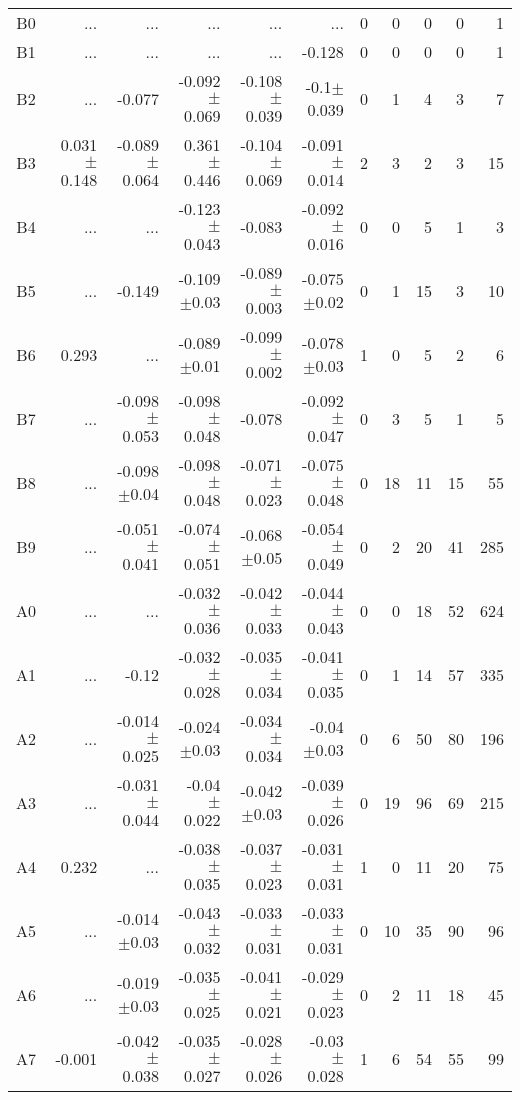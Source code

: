 \begin{table}[t]
\begin{table}[t]
\begin{center}
\begin{tabular}{c|rrrrr|rrrrr}
    B0	&	 ...	&	 ...	&	 ...	&	 ...	&	 ...	&	0	&	0	&	0	&	0	&	1	\\
    B1	&	 ...	&	 ...	&	 ...	&	 ...	&	-0.128	&	0	&	0	&	0	&	0	&	1	\\
    B2	&	 ...	&	-0.077	&	-0.092$\pm$0.069	&	-0.108$\pm$0.039	&	-0.1$\pm$0.039	&	0	&	1	&	4	&	3	&	7	\\
    B3	&	0.031$\pm$0.148	&	-0.089$\pm$0.064	&	0.361$\pm$0.446	&	-0.104$\pm$0.069	&	-0.091$\pm$0.014	&	2	&	3	&	2	&	3	&	15	\\
    B4	&	 ...	&	 ...	&	-0.123$\pm$0.043	&	-0.083	&	-0.092$\pm$0.016	&	0	&	0	&	5	&	1	&	3	\\
    B5	&	 ...	&	-0.149	&	-0.109$\pm$0.03	&	-0.089$\pm$0.003	&	-0.075$\pm$0.02	&	0	&	1	&	15	&	3	&	10	\\
    B6	&	0.293	&	 ...	&	-0.089$\pm$0.01	&	-0.099$\pm$0.002	&	-0.078$\pm$0.03	&	1	&	0	&	5	&	2	&	6	\\
    B7	&	 ...	&	-0.098$\pm$0.053	&	-0.098$\pm$0.048	&	-0.078	&	-0.092$\pm$0.047	&	0	&	3	&	5	&	1	&	5	\\
    B8	&	 ...	&	-0.098$\pm$0.04	&	-0.098$\pm$0.048	&	-0.071$\pm$0.023	&	-0.075$\pm$0.048	&	0	&	18	&	11	&	15	&	55	\\
    B9	&	 ...	&	-0.051$\pm$0.041	&	-0.074$\pm$0.051	&	-0.068$\pm$0.05	&	-0.054$\pm$0.049	&	0	&	2	&	20	&	41	&	285	\\
    A0	&	 ...	&	 ...	&	-0.032$\pm$0.036	&	-0.042$\pm$0.033	&	-0.044$\pm$0.043	&	0	&	0	&	18	&	52	&	624	\\
    A1	&	 ...	&	-0.12	&	-0.032$\pm$0.028	&	-0.035$\pm$0.034	&	-0.041$\pm$0.035	&	0	&	1	&	14	&	57	&	335	\\
    A2	&	 ...	&	-0.014$\pm$0.025	&	-0.024$\pm$0.03	&	-0.034$\pm$0.034	&	-0.04$\pm$0.03	&	0	&	6	&	50	&	80	&	196	\\
    A3	&	 ...	&	-0.031$\pm$0.044	&	-0.04$\pm$0.022	&	-0.042$\pm$0.03	&	-0.039$\pm$0.026	&	0	&	19	&	96	&	69	&	215	\\
    A4	&	0.232	&	 ...	&	-0.038$\pm$0.035	&	-0.037$\pm$0.023	&	-0.031$\pm$0.031	&	1	&	0	&	11	&	20	&	75	\\
    A5	&	 ...	&	-0.014$\pm$0.03	&	-0.043$\pm$0.032	&	-0.033$\pm$0.031	&	-0.033$\pm$0.031	&	0	&	10	&	35	&	90	&	96	\\
    A6	&	 ...	&	-0.019$\pm$0.03	&	-0.035$\pm$0.025	&	-0.041$\pm$0.021	&	-0.029$\pm$0.023	&	0	&	2	&	11	&	18	&	45	\\
    A7	&	-0.001	&	-0.042$\pm$0.038	&	-0.035$\pm$0.027	&	-0.028$\pm$0.026	&	-0.03$\pm$0.028	&	1	&	6	&	54	&	55	&	99	\\

\end{tabular}
\end{center}
\end{table}
\end{table}
